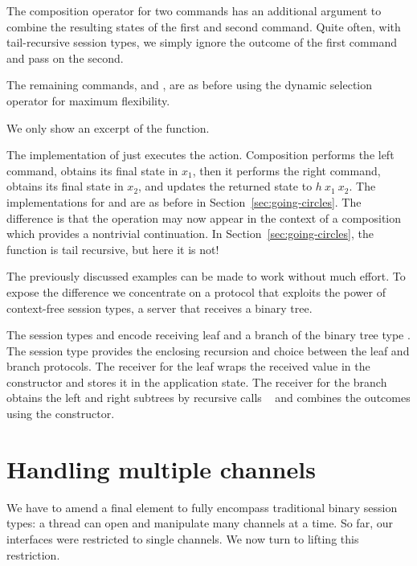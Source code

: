 \documentclass[acmsmall,screen,anonymous,review]{acmart}
\begin{document}
The composition operator for two commands has an additional argument
to combine the resulting states of the first and second command. Quite
often, with tail-recursive session types, we simply ignore the outcome
of the first command and pass on the second.

The remaining commands, {\ACSELECT} and {\ACCHOICE}, are as before using
the dynamic selection operator for maximum flexibility.

We only show an excerpt of the {\Aexecutor} function.
\cstExec

The implementation of {\ACSKIP} just executes the action.
Composition performs the left command, obtains its final state in
$x_1$, then it performs the right command, obtains its final state in
$x_2$, and updates the returned state to $h~x_1~x_2$.
The implementations for {\AMU} and {\ACONTINUE} are as before in
Section~\ref{sec:going-circles}. The difference is that the
{\ACONTINUE} operation may now appear in the context of a composition
which provides a nontrivial continuation. In
Section~\ref{sec:going-circles}, the function {\Aexecutor} is tail
recursive, but here it is not!


The previously discussed examples can be made to work without much
effort. To expose the difference we concentrate on a protocol that exploits the power of
context-free session types, a server that receives a binary tree.
\cstTreep

The session types {\Aleafp} and {\Abranchp} encode receiving leaf and
a branch of the binary tree type {\AIntTree}. The session type
{\Atreep} provides the enclosing recursion and choice between the leaf
and branch protocols.
The receiver for the leaf wraps the received value in the {\ACLeaf}
constructor and stores it in the application state.
The receiver for the branch obtains the left and right subtrees by
recursive calls {\ACONTINUE~\Azero} and combines the outcomes using
the {\ACBranch} constructor.



\section{Handling multiple channels}
\label{sec:handl-mult-chann}

We have to amend a final element to fully encompass traditional binary
session types: a thread can open and manipulate many channels at a
time. So far, our interfaces were restricted to single channels. We
now turn to lifting this restriction.
\end{document}
